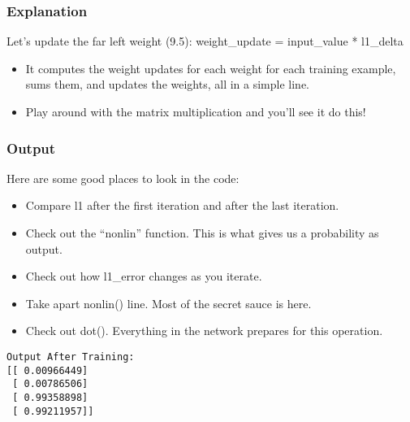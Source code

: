 \begin{frame}[fragile] \frametitle{Explanation}
Let's update the far left weight (9.5): weight\_update = input\_value * l1\_delta
\begin{itemize}
\item It computes the weight updates for each weight for each training example, sums them, and updates the weights, all in a simple line. 
\item Play around with the matrix multiplication and you'll see it do this! 
\end{itemize}
\end{frame}

\begin{frame}[fragile] \frametitle{Output}


Here are some good places to look in the code: 
\begin{itemize}
\item Compare l1 after the first iteration and after the last iteration.
\item Check out the ``nonlin'' function. This is what gives us a probability as output.
\item Check out how l1\_error changes as you iterate.
\item Take apart nonlin() line. Most of the secret sauce is here.
\item Check out dot(). Everything in the network prepares for this operation. 
\end{itemize}

\begin{lstlisting}
Output After Training:
[[ 0.00966449]
 [ 0.00786506]
 [ 0.99358898]
 [ 0.99211957]]
\end{lstlisting}
\end{frame}


